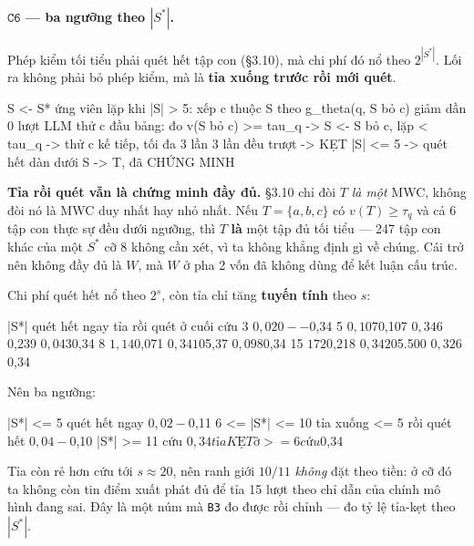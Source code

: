 \documentclass[11pt,a4paper]{article}
\begin{document}
\paragraph{$\mathtt{C6}$ --- ba ngưỡng theo $|S^*|$.} Phép kiểm tối tiểu phải quét hết tập con
(\S3.10), mà chi phí đó nổ theo $2^{|S^*|}$. Lối ra không phải bỏ phép kiểm, mà là \textbf{tỉa
xuống trước rồi mới quét}.

\begin{dia}
S <- S* ứng viên
lặp khi |S| > 5:
    xếp c thuộc S theo g_theta(q, S bỏ c) giảm dần           0 lượt LLM
    thử c đầu bảng:  đo v(S bỏ c)
        >= tau_q  ->  S <- S bỏ c,  lặp
        <  tau_q  ->  thử c kế tiếp, tối đa 3 lần
    3 lần đều trượt  ->  KẸT
|S| <= 5  ->  quét hết dàn dưới S  ->  T, đã CHỨNG MINH
\end{dia}

\textbf{Tỉa rồi quét vẫn là chứng minh đầy đủ.} \S3.10 chỉ đòi $T$ \emph{là một} MWC, không
đòi nó là MWC duy nhất hay nhỏ nhất. Nếu $T=\{a,b,c\}$ có $v(T)\ge\tau_q$ và cả 6 tập con
thực sự đều dưới ngưỡng, thì $T$ \textbf{là} một tập đủ tối tiểu --- 247 tập con khác của một
$S^*$ cỡ 8 không cần xét, vì ta không khẳng định gì về chúng. Cái trở nên không đầy đủ là $W$,
mà $W$ ở pha 2 vốn đã không dùng để kết luận cấu trúc.

Chi phí quét hết nổ theo $2^s$, còn tỉa chỉ tăng \textbf{tuyến tính} theo $s$:

\begin{dia}
|S*|   quét hết ngay    tỉa rồi quét ở cuối    cứu
 3        $0,020               --             $0,34
 5        $0,107            $0,107            $0,34
 6        $0,239            $0,043            $0,34
 8        $1,14             $0,071            $0,34
10        $5,37             $0,098            $0,34
15        $172              $0,218            $0,34
20        $5.500            $0,326            $0,34
\end{dia}

Nên ba ngưỡng:

\begin{dia}
|S*| <= 5         quét hết ngay                        $0,02 - $0,11
6 <= |S*| <= 10   tỉa xuống <= 5 rồi quét hết          $0,04 - $0,10
|S*| >= 11        cứu                                  $0,34
tỉa KẸT ở >= 6    cứu                                  $0,34
\end{dia}

Tỉa còn rẻ hơn cứu tới $s\approx 20$, nên ranh giới $10/11$ \emph{không} đặt theo tiền: ở cỡ
đó ta không còn tin điểm xuất phát đủ để tỉa 15 lượt theo chỉ dẫn của chính mô hình đang sai.
Đây là một núm mà \texttt{B3} đo được rồi chỉnh --- đo tỷ lệ tỉa-kẹt theo $|S^*|$.
\end{document}
